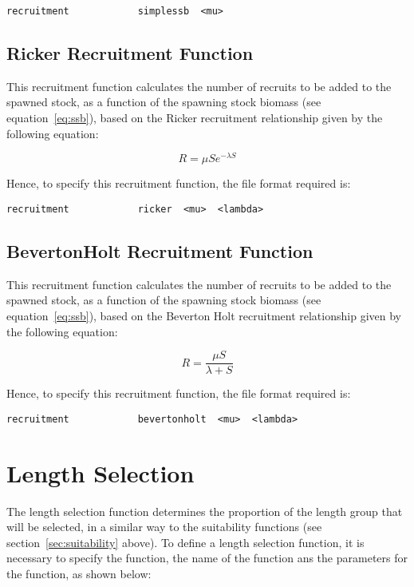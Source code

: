 \documentclass[10pt,twoside]{book}
\begin{document}
{\small\begin{verbatim}
recruitment            simplessb  <mu>
\end{verbatim}}

\subsection{Ricker Recruitment Function}
This recruitment function calculates the number of recruits to be added to the spawned stock, as a function of the spawning stock biomass (see equation~\ref{eq:ssb}), based on the Ricker recruitment relationship given by the following equation:

\begin{equation}\label{eq:rec3}
R = \mu S e ^{-\lambda S}
\end{equation}

Hence, to specify this recruitment function, the file format required is:

{\small\begin{verbatim}
recruitment            ricker  <mu>  <lambda>
\end{verbatim}}

\subsection{BevertonHolt Recruitment Function}
This recruitment function calculates the number of recruits to be added to the spawned stock, as a function of the spawning stock biomass (see equation~\ref{eq:ssb}), based on the Beverton Holt recruitment relationship given by the following equation:

\begin{equation}\label{eq:rec4}
R = \frac{\mu S}{\lambda + S}
\end{equation}

Hence, to specify this recruitment function, the file format required is:

{\small\begin{verbatim}
recruitment            bevertonholt  <mu>  <lambda>
\end{verbatim}}

\section{Length Selection}\label{sec:lselection}
The length selection function determines the proportion of the length group that will be selected, in a similar way to the suitability functions (see section~\ref{sec:suitability} above).  To define a length selection function, it is necessary to specify the function, the name of the function ans the parameters for the function, as shown below:
\end{document}
